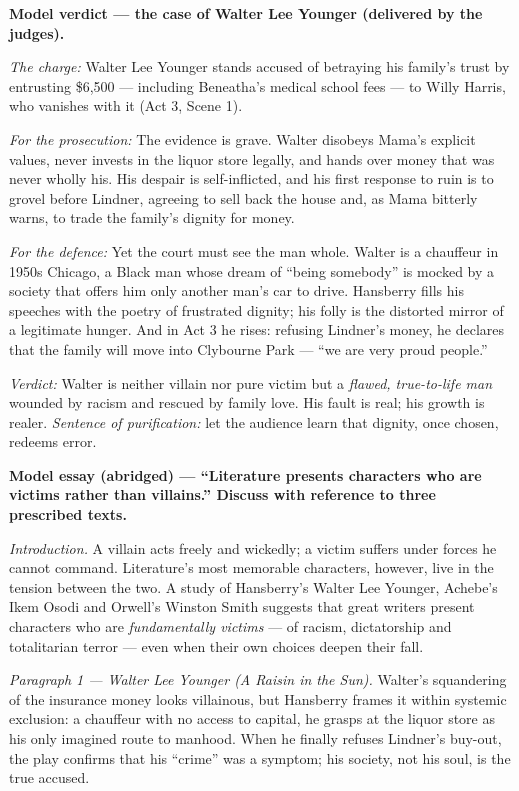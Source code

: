 \documentclass[11pt]{article}
\newcounter{popsec}
\newcounter{popsub}
\newcommand{\courssub}[1]{%
  \stepcounter{popsub}%
  \par\vspace{9pt}\noindent{\popxbold\fontsize{11.5}{13}\selectfont\color{popink}{\color{poporange}\thepopsec.\thepopsub}\hspace{6pt}#1}\par\nopagebreak\vspace{4pt}
}
\begin{document}
\courssub{Model answer}

\textbf{Model verdict — the case of Walter Lee Younger (delivered by the judges).}\par
\medskip
\emph{The charge:} Walter Lee Younger stands accused of betraying his family's trust by entrusting \$6,500 — including Beneatha's medical school fees — to Willy Harris, who vanishes with it (Act 3, Scene 1).

\emph{For the prosecution:} The evidence is grave. Walter disobeys Mama's explicit values, never invests in the liquor store legally, and hands over money that was never wholly his. His despair is self-inflicted, and his first response to ruin is to grovel before Lindner, agreeing to sell back the house and, as Mama bitterly warns, to trade the family's dignity for money.

\emph{For the defence:} Yet the court must see the man whole. Walter is a chauffeur in 1950s Chicago, a Black man whose dream of ``being somebody'' is mocked by a society that offers him only another man's car to drive. Hansberry fills his speeches with the poetry of frustrated dignity; his folly is the distorted mirror of a legitimate hunger. And in Act 3 he rises: refusing Lindner's money, he declares that the family will move into Clybourne Park — ``we are very proud people.''

\emph{Verdict:} Walter is neither villain nor pure victim but a \emph{flawed, true-to-life man} wounded by racism and rescued by family love. His fault is real; his growth is realer. \emph{Sentence of purification:} let the audience learn that dignity, once chosen, redeems error.

\bigskip
\textbf{Model essay (abridged) — ``Literature presents characters who are victims rather than villains.'' Discuss with reference to three prescribed texts.}\par
\medskip
\emph{Introduction.} A villain acts freely and wickedly; a victim suffers under forces he cannot command. Literature's most memorable characters, however, live in the tension between the two. A study of Hansberry's Walter Lee Younger, Achebe's Ikem Osodi and Orwell's Winston Smith suggests that great writers present characters who are \emph{fundamentally victims} — of racism, dictatorship and totalitarian terror — even when their own choices deepen their fall.

\emph{Paragraph 1 — Walter Lee Younger (A Raisin in the Sun).} Walter's squandering of the insurance money looks villainous, but Hansberry frames it within systemic exclusion: a chauffeur with no access to capital, he grasps at the liquor store as his only imagined route to manhood. When he finally refuses Lindner's buy-out, the play confirms that his ``crime'' was a symptom; his society, not his soul, is the true accused.
\end{document}
